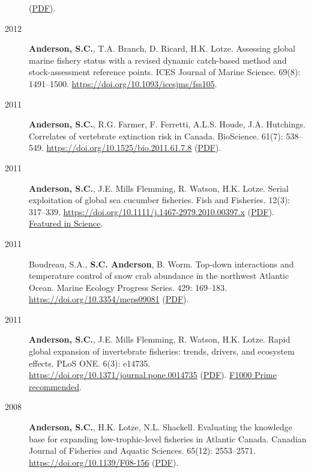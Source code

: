 \begin{description}
(\href{https://www.dropbox.com/s/rdn9685viqr37qy/Harnik_etal_2012_Extinctions_in_ancient_and_modern_seas.pdf?dl=1}{PDF}).
\item[2012]
\textbf{Anderson, S.C.}, T.A. Branch, D. Ricard, H.K. Lotze. Assessing
global marine fishery status with a revised dynamic catch-based method
and stock-assessment reference points. ICES Journal of Marine Science.
69(8): 1491--1500. \url{https://doi.org/10.1093/icesjms/fss105}.
\item[2011]
\textbf{Anderson, S.C.}, R.G. Farmer, F. Ferretti, A.L.S. Houde, J.A.
Hutchings. Correlates of vertebrate extinction risk in Canada.
BioScience. 61(7): 538--549.
\url{https://doi.org/10.1525/bio.2011.61.7.8}
(\href{https://www.dropbox.com/s/bt16dvi3idw3gdx/Anderson_etal_2011_BioScience_with_supplement.pdf?dl=1}{PDF}).
\item[2011]
\textbf{Anderson, S.C.}, J.E. Mills Flemming, R. Watson, H.K. Lotze.
Serial exploitation of global sea cucumber fisheries. Fish and
Fisheries. 12(3): 317--339.
\url{https://doi.org/10.1111/j.1467-2979.2010.00397.x}
(\href{https://www.dropbox.com/s/d8id4zxe9xv6jau/Anderson_etal_2011_seacucumbers_with_supplement.pdf?dl=1}{PDF}).
\href{http://www.sciencemag.org/content/331/6014/129.1.full}{Featured in
Science}.
\item[2011]
Boudreau, S.A., \textbf{S.C. Anderson}, B. Worm. Top-down interactions
and temperature control of snow crab abundance in the northwest Atlantic
Ocean. Marine Ecology Progress Series. 429: 169--183.
\url{https://doi.org/10.3354/meps09081}
(\href{http://www.int-res.com/articles/meps_oa/m429p169.pdf}{PDF}).
\item[2011]
\textbf{Anderson, S.C.}, J.E. Mills Flemming, R. Watson, H.K. Lotze.
Rapid global expansion of invertebrate fisheries: trends, drivers, and
ecosystem effects. PLoS ONE. 6(3): e14735.
\url{https://doi.org/10.1371/journal.pone.0014735}
(\href{http://www.plosone.org/article/fetchObject.action?uri=info\%3Adoi\%2F10.1371\%2Fjournal.pone.0014735&representation=PDF}{PDF}).
\href{https://f1000.com/prime/9542957}{F1000 Prime recommended}.
\item[2008]
\textbf{Anderson, S.C.}, H.K. Lotze, N.L. Shackell. Evaluating the
knowledge base for expanding low-trophic-level fisheries in Atlantic
Canada. Canadian Journal of Fisheries and Aquatic Sciences. 65(12):
2553--2571. \url{https://doi.org/10.1139/F08-156}
(\href{https://www.dropbox.com/s/b0la81jbqitib6u/Anderson_etal_2008_knowledge.pdf?dl=1}{PDF}).
\end{description}

